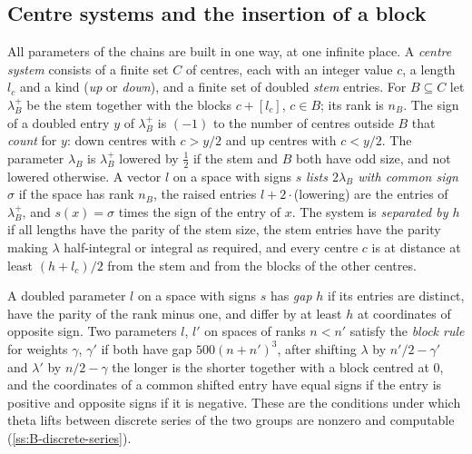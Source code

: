 \subsection{Centre systems and the insertion of a block}\label{ss:centres}
All parameters of the chains are built in one way, at one infinite place. A \emph{centre system}
consists of a finite set $C$ of centres, each with an integer value $c$, a length $l_c$ and a kind
(\emph{up} or \emph{down}), and a finite set of doubled \emph{stem} entries. For $B\subseteq C$ let
$\lambda^+_B$ be the stem together with the blocks $c+[l_c]$, $c\in B$; its rank is $n_B$. The sign of a
doubled entry $y$ of $\lambda^+_B$ is $(-1)$ to the number of centres outside $B$ that \emph{count} for
$y$: down centres with $c>y/2$ and up centres with $c<y/2$. The parameter $\lambda_B$ is $\lambda^+_B$
lowered by $\frac12$ if the stem and $B$ both have odd size, and not lowered otherwise. A vector $l$ on a
space with signs $s$ \emph{lists $2\lambda_B$ with common sign $\sigma$} if the space has rank $n_B$, the
raised entries $l+2\cdot$(lowering) are the entries of $\lambda^+_B$, and $s(x)=\sigma$ times the sign of
the entry of $x$. The system is \emph{separated by $h$} if all lengths have the parity of the stem size,
the stem entries have the parity making $\lambda$ half-integral or integral as required, and every
centre $c$ is at distance at least $(h+l_c)/2$ from the stem and from the blocks of the other centres.

A doubled parameter $l$ on a space with signs $s$ has \emph{gap} $h$ if its entries are distinct, have
the parity of the rank minus one, and differ by at least $h$ at coordinates of opposite sign. Two
parameters $l$, $l'$ on spaces of ranks $n<n'$ satisfy the \emph{block rule} for weights $\gamma$,
$\gamma'$ if both have gap $500(n+n')^3$, after shifting $\lambda$ by $n'/2-\gamma'$ and $\lambda'$ by
$n/2-\gamma$ the longer is the shorter together with a block centred at $0$, and the coordinates of a
common shifted entry have equal signs if the entry is positive and opposite signs if it is negative.
These are the conditions under which theta lifts between discrete series of the two groups are
nonzero and computable (\cref{ss:B-discrete-series}).

